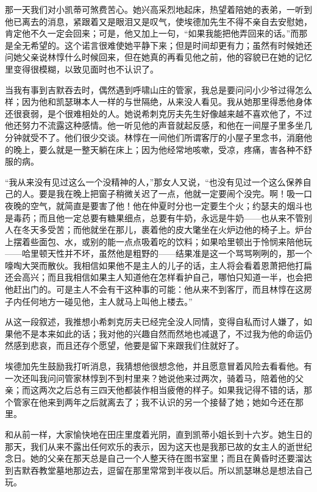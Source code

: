 \par 那一天我们对小凯蒂可煞费苦心。她兴高采烈地起床，热望着陪她的表弟，一听到他已离去的消息，紧跟着又是眼泪又是叹气，使埃德加先生不得不亲自去安慰她，肯定他不久一定会回来；可是，他又加上一句，“如果我能把他弄回来的话。”而那是全无希望的。这个诺言很难使她平静下来；但是时间却更有力；虽然有时候她还问她父亲说林惇什么时候回来，但在她真的再看见他之前，他的容貌已在她的记忆里变得很模糊，以致见面时也不认识了。
\par 当我有事到吉默吞去时，偶然遇到呼啸山庄的管家，我总是要问问小少爷过得怎么样；因为他和凯瑟琳本人一样的与世隔绝，从来没人看见。我从她那里得悉他身体还很衰弱，是个很难相处的人。她说希刺克厉夫先生好像越来越不喜欢他了，不过他还努力不流露这种感情。他一听见他的声音就起反感，和他在一间屋子里多坐几分钟就受不了。他们很少交谈。林惇在一间他们所谓客厅的小屋子里念书，消磨他的晚上，要么就是一整天躺在床上；因为他经常地咳嗽，受凉，疼痛，害各种不舒服的病。
\par “我从来没有见过这么一个没精神的人，”那女人又说，“也没有见过一个这么保养自己的人。要是我在晚上把窗子稍微关迟了一点，他就一定要闹个没完。啊！吸一口夜晚的空气，就简直是要害了他！他在仲夏时分也一定要生个火；约瑟夫的烟斗也是毒药；而且他一定总要有糖果细点，总要有牛奶，永远是牛奶——也从来不管别人在冬天多受苦；而他就坐在那儿，裹着他的皮大氅坐在火炉边他的椅子上。炉台上摆着些面包、水，或别的能一点点吸着吃的饮料；如果哈里顿出于怜悯来陪他玩——哈里顿天性并不坏，虽然他是粗野的——结果准是这一个骂骂咧咧的，那一个嚎啕大哭而散伙。我相信如果他不是主人的儿子的话，主人将会看着恩萧把他打扁还会高兴；而且我相信如果主人知道他在怎样看护自己，哪怕只知道一半，也会把他赶出门的。可是主人不会有干这种事的可能：他从来不到客厅，而且林惇在这房子内任何地方一碰见他，主人就马上叫他上楼去。”
\par 从这一段叙述，我推想小希刺克厉夫已经完全没人同情，变得自私而讨人嫌了，如果他不是本来如此的话；我对他的兴趣自然而然地也减退了，不过我为他的命运仍然感到悲哀，而且还存个愿望，他要是留下来跟我们住就好了。
\par 埃德加先生鼓励我打听消息，我猜想他很想念他，并且愿意冒着风险去看看他。有一次还叫我问问管家林惇到不到村里来？她说他来过两次，骑着马，陪着他的父亲；而这两次之后总有三四天他都装作相当疲倦的样子。如果我记得不错的话，那个管家在他来到两年之后就离去了；我不认识的另一个接替了她；她如今还在那里。
\par 和从前一样，大家愉快地在田庄里度着光阴，直到凯蒂小姐长到十六岁。她生日的那天，我们从来不露出任何欢乐的表示，因为这天也是我那已故的女主人的逝世纪念日。她的父亲在那天总是自己一个人整天待在图书室里；而且在黄昏时还要溜达到吉默吞教堂墓地那边去，逗留在那里常常到半夜以后。所以凯瑟琳总是想法自己玩。
